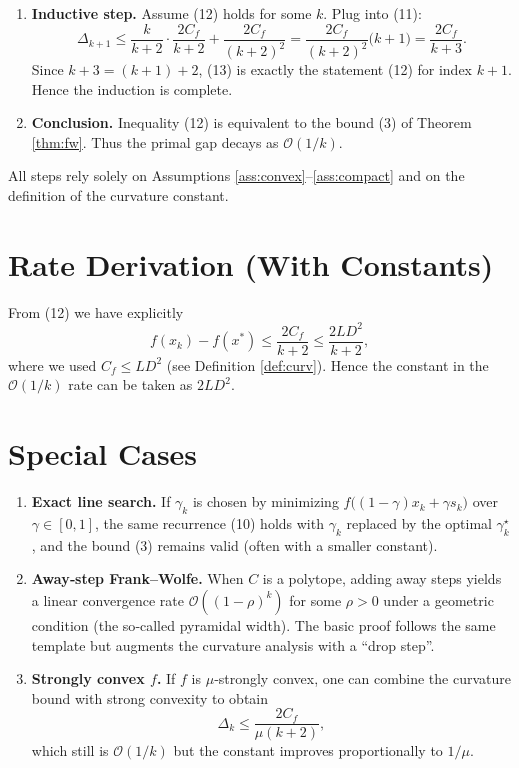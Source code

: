 \documentclass{article}
\begin{document}
\begin{enumerate}
\item[Step 10.] \textbf{Inductive step.}  
Assume (12) holds for some $k$. Plug into (11):
\[
\Delta_{k+1}\le\frac{k}{k+2}\cdot\frac{2C_{f}}{k+2}+\frac{2C_{f}}{(k+2)^{2}}
= \frac{2C_{f}}{(k+2)^{2}}\bigl(k+1\bigr)
= \frac{2C_{f}}{k+3}.
\tag{13}
\]
Since $k+3 = (k+1)+2$, (13) is exactly the statement (12) for index $k+1$. Hence the induction is complete.

\item[Step 11.] \textbf{Conclusion.}  
Inequality (12) is equivalent to the bound (3) of Theorem \ref{thm:fw}. Thus the primal gap decays as $\mathcal{O}(1/k)$.
\end{enumerate}
All steps rely solely on Assumptions \ref{ass:convex}–\ref{ass:compact} and on the definition of the curvature constant.

\section*{Rate Derivation (With Constants)}
From (12) we have explicitly
\[
f(x_{k})-f(x^{*})\le\frac{2C_{f}}{k+2}\le\frac{2L D^{2}}{k+2},
\]
where we used $C_{f}\le L D^{2}$ (see Definition \ref{def:curv}). Hence the constant in the $\mathcal{O}(1/k)$ rate can be taken as $2L D^{2}$.

\section*{Special Cases}
\begin{enumerate}[label=\arabic*.]
\item \textbf{Exact line search.}  
If $\gamma_{k}$ is chosen by minimizing $f\bigl((1-\gamma)x_{k}+\gamma s_{k}\bigr)$ over $\gamma\in[0,1]$, the same recurrence (10) holds with $\gamma_{k}$ replaced by the optimal $\gamma_{k}^{\star}$, and the bound (3) remains valid (often with a smaller constant).

\item \textbf{Away‑step Frank–Wolfe.}  
When $C$ is a polytope, adding away steps yields a linear convergence rate $\mathcal{O}((1-\rho)^{k})$ for some $\rho>0$ under a geometric condition (the so‑called pyramidal width). The basic proof follows the same template but augments the curvature analysis with a “drop step”.

\item \textbf{Strongly convex $f$.}  
If $f$ is $\mu$‑strongly convex, one can combine the curvature bound with strong convexity to obtain
\[
\Delta_{k}\le\frac{2C_{f}}{\mu(k+2)},
\]
which still is $\mathcal{O}(1/k)$ but the constant improves proportionally to $1/\mu$.
\end{enumerate}
\end{document}
